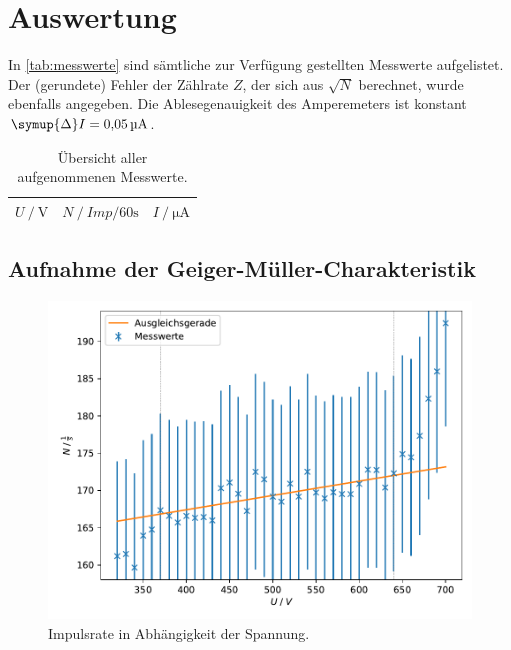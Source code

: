\section{Auswertung} \label{sec:Auswertung}

In \autoref{tab:messwerte} sind sämtliche zur Verfügung gestellten Messwerte aufgelistet.
Der (gerundete) Fehler der Zählrate $Z$, der sich aus $\sqrt{N}$ berechnet, wurde ebenfalls angegeben.
Die Ablesegenauigkeit des Amperemeters ist konstant $\symup{\Delta}I=\SI{0.05}{\micro\ampere}$.

\begin{table}[H]
  \centering
  \caption{Übersicht aller aufgenommenen Messwerte.}
  \label{tab:messwerte}
  \begin{tabular}{c c c}
  \toprule
  $U \mathbin{/} \si{\volt}$ &
  $N \mathbin{/} \si{{Imp} \per 60 \second}$ &
  $I \mathbin{/} \si{\micro\ampere}$ \\
  \midrule
  
  \bottomrule
  \end{tabular}
\end{table}


\subsection{Aufnahme der Geiger-Müller-Charakteristik}


\begin{figure}
  \centering
  \includegraphics[width=\textwidth]{build/plot1.pdf}
  \caption{Impulsrate in Abhängigkeit der Spannung.}
  \label{fig:plot1}
\end{figure}

